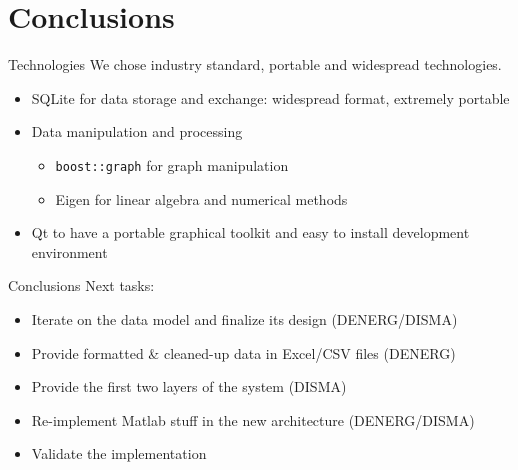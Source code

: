 \documentclass[10pt,aspectratio=169]{beamer}
\begin{document}
\section{Conclusions}

\begin{frame}{Technologies}
    We chose industry standard, portable and widespread technologies.
    \begin{itemize}
        \item SQLite for data storage and exchange: widespread format, extremely portable
        \item Data manipulation and processing
        \begin{itemize}
            \item \texttt{boost::graph} for graph manipulation
            \item Eigen for linear algebra and numerical methods
        \end{itemize}
        \item Qt to have a portable graphical toolkit and easy to install development environment
    \end{itemize}
\end{frame}

\begin{frame}{Conclusions}
    Next tasks:
    \begin{itemize}
        \item Iterate on the data model and finalize its design (DENERG/DISMA)
        \item Provide formatted \& cleaned-up data in Excel/CSV files (DENERG)
        \item Provide the first two layers of the system (DISMA)
        \item Re-implement Matlab stuff in the new architecture (DENERG/DISMA)
        \item Validate the implementation
    \end{itemize}
\end{frame}
\end{document}
